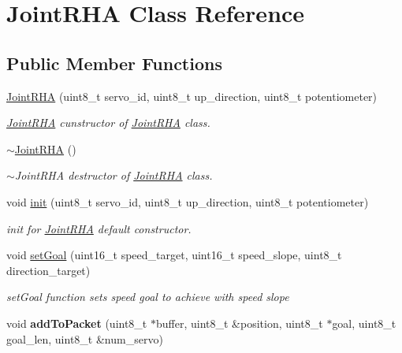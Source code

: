 \hypertarget{classJointRHA}{}\section{Joint\+R\+HA Class Reference}
\label{classJointRHA}
\subsection*{Public Member Functions}
\begin{DoxyCompactItemize}
\item 
\hyperlink{classJointRHA_a2f15a460350b23ccbd5599e9f0adc855}{Joint\+R\+HA} (uint8\+\_\+t servo\+\_\+id, uint8\+\_\+t up\+\_\+direction, uint8\+\_\+t potentiometer)
\begin{DoxyCompactList}\small\item\em \hyperlink{classJointRHA}{Joint\+R\+HA} cunstructor of \hyperlink{classJointRHA}{Joint\+R\+HA} class. \end{DoxyCompactList}\item 
\hyperlink{classJointRHA_a9e54cc4dde103847c9d17f329302a981}{$\sim$\+Joint\+R\+HA} ()\hypertarget{classJointRHA_a9e54cc4dde103847c9d17f329302a981}{}\label{classJointRHA_a9e54cc4dde103847c9d17f329302a981}

\begin{DoxyCompactList}\small\item\em $\sim$\+Joint\+R\+HA destructor of \hyperlink{classJointRHA}{Joint\+R\+HA} class. \end{DoxyCompactList}\item 
void \hyperlink{classJointRHA_acf5dd56eb854250047a9ee2d0a402e4f}{init} (uint8\+\_\+t servo\+\_\+id, uint8\+\_\+t up\+\_\+direction, uint8\+\_\+t potentiometer)
\begin{DoxyCompactList}\small\item\em init for \hyperlink{classJointRHA}{Joint\+R\+HA} default constructor. \end{DoxyCompactList}\item 
void \hyperlink{classJointRHA_a54a96a85108db8b497aff9dd09f9d671}{set\+Goal} (uint16\+\_\+t speed\+\_\+target, uint16\+\_\+t speed\+\_\+slope, uint8\+\_\+t direction\+\_\+target)
\begin{DoxyCompactList}\small\item\em set\+Goal function sets speed goal to achieve with speed slope \end{DoxyCompactList}\item 
void {\bfseries add\+To\+Packet} (uint8\+\_\+t $\ast$buffer, uint8\+\_\+t \&position, uint8\+\_\+t $\ast$goal, uint8\+\_\+t goal\+\_\+len, uint8\+\_\+t \&num\+\_\+servo)\hypertarget{classJointRHA_a01bdf1839655467b1d8b4dc179595953}{}\label{classJointRHA_a01bdf1839655467b1d8b4dc179595953}


\end{DoxyCompactItemize}

